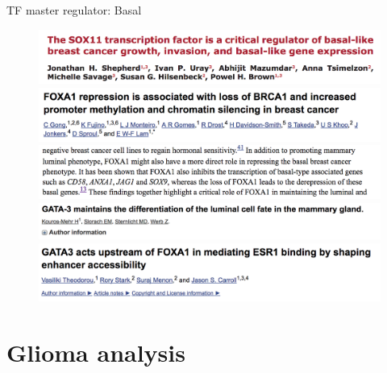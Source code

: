 \documentclass[slidestop,compress,11pt,xcolor=dvipsnames]{beamer}
\begin{document}
\begin{frame}{TF master regulator: Basal}

 \begin{figure}[ht!]
  \centering
  \includegraphics[width=1.0\textwidth]{ELMER/SOX11_basal.png}
  \includegraphics[width=1.0\textwidth]{ELMER/SOX9_2.png}
  \includegraphics[width=1.0\textwidth]{ELMER/SOX9_1.png}
  \includegraphics[width=1.0\textwidth]{ELMER/GATA3.png}
  \includegraphics[width=1.0\textwidth]{ELMER/cofactors.png}
     \end{figure}
\end{frame}

\section{Glioma analysis}
\end{document}
